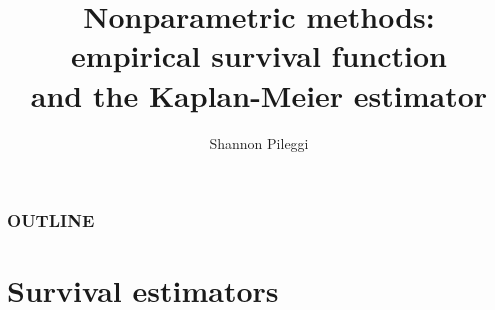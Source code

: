 



\title[Set 4]{Nonparametric methods: \\ empirical survival function \\and the Kaplan-Meier estimator}
\author[Pileggi]{Shannon Pileggi}


\date{}




\begin{frame}
\titlepage
\end{frame}

\begin{frame}
\frametitle{OUTLINE\qquad\qquad\qquad} \tableofcontents[hideallsubsections]
\end{frame}


\section[Survival estimators]{Survival estimators}
\subsection{}

